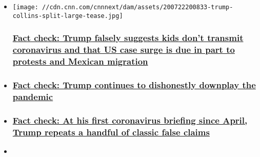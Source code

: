 \begin{itemize}
\item
  \href{/2020/07/22/politics/fact-check-trump-coronavirus-briefing-july-22/index.html}{}

  \texttt{[image: //cdn.cnn.com/cnnnext/dam/assets/200722200833-trump-collins-split-large-tease.jpg]}

  \hypertarget{fact-check-trump-falsely-suggests-kids-dont-transmit-coronavirus-and-that-us-case-surge-is-due-in-part-to-protests-and-mexican-migration}{%
  \subsubsection{\texorpdfstring{\href{/2020/07/22/politics/fact-check-trump-coronavirus-briefing-july-22/index.html}{Fact
  check: Trump falsely suggests kids don't transmit coronavirus and that
  US case surge is due in part to protests and Mexican
  migration}}{Fact check: Trump falsely suggests kids don't transmit coronavirus and that US case surge is due in part to protests and Mexican migration}}\label{fact-check-trump-falsely-suggests-kids-dont-transmit-coronavirus-and-that-us-case-surge-is-due-in-part-to-protests-and-mexican-migration}}
\item
  \hypertarget{fact-check-trump-continues-to-dishonestly-downplay-the-pandemic}{%
  \subsubsection{\texorpdfstring{\href{/2020/07/23/politics/trump-july-23-coronavirus-briefing-fact-check/index.html}{Fact
  check: Trump continues to dishonestly downplay the
  pandemic}}{Fact check: Trump continues to dishonestly downplay the pandemic}}\label{fact-check-trump-continues-to-dishonestly-downplay-the-pandemic}}
\item
  \hypertarget{fact-check-at-his-first-coronavirus-briefing-since-april-trump-repeats-a-handful-of-classic-false-claims}{%
  \subsubsection{\texorpdfstring{\href{/2020/07/21/politics/fact-check-trump-coronavirus-briefing-july-21/index.html}{Fact
  check: At his first coronavirus briefing since April, Trump repeats a
  handful of classic false
  claims}}{Fact check: At his first coronavirus briefing since April, Trump repeats a handful of classic false claims}}\label{fact-check-at-his-first-coronavirus-briefing-since-april-trump-repeats-a-handful-of-classic-false-claims}}
\item
  \hypertarget{fact-check-are-people-immune-from-the-coronavirus-if-theyve-already-had-it}{%
}
\end{itemize}
